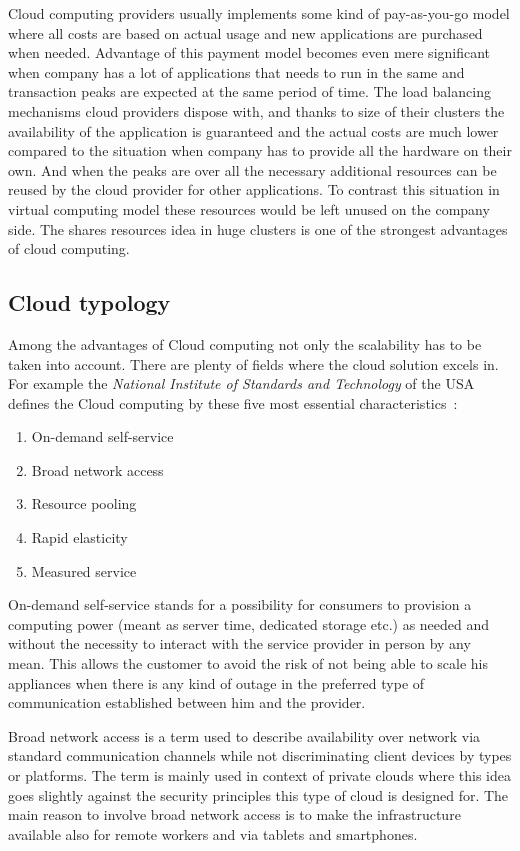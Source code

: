 Cloud computing providers usually implements some kind of pay-as-you-go model where all costs are based on actual usage and new applications are purchased when needed. Advantage of this payment model becomes even mere significant when company has a lot of applications that needs to run in the same and transaction peaks are expected at the same period of time. The load balancing mechanisms cloud providers dispose with, and thanks to size of their clusters the availability of the application is guaranteed  and the actual costs are much lower compared to the situation when company has to provide all the hardware on their own. And when the peaks are over all the necessary additional resources can be reused by the cloud provider for other applications. To contrast this situation in virtual computing model these resources would be left unused on the company side. The shares resources idea in huge clusters is one of the strongest advantages of cloud computing.

\subsection{Cloud typology}
\label{sub:Cloud typology}

Among the advantages of Cloud computing not only the scalability has to be taken into account. There are plenty of fields where the cloud solution excels in. For example the \emph{National Institute of Standards and Technology} of the USA defines the Cloud computing by these five most essential characteristics~\cite{hu}:

\begin{enumerate}
	\item On-demand self-service
	\item Broad network access
	\item Resource pooling
	\item Rapid elasticity
	\item Measured service
\end{enumerate}

On-demand self-service stands for a possibility for consumers to provision a computing power (meant as server time, dedicated storage etc.) as needed and without the necessity to interact with the service provider in person by any mean. This allows the customer to avoid the risk of not being able to scale his appliances when there is any kind of outage in the preferred type of communication established between him and the provider.

Broad network access is a term used to describe availability over network via standard communication channels while not discriminating client devices by types or platforms. The term is mainly used in context of private clouds where this idea goes slightly against the security principles this type of cloud is designed for. The main reason to involve broad network access is to make the infrastructure available also for remote workers and via tablets and smartphones.


